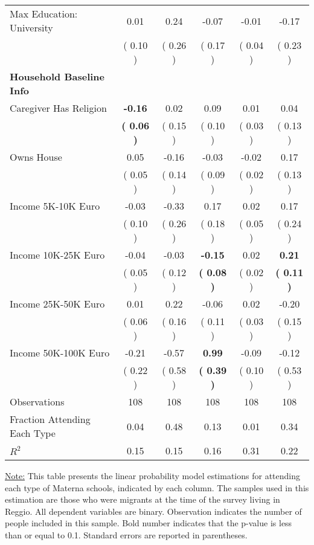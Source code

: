 \begin{table}[H]
{\begin{tabular}{lccccc}
\quad Max Education: University &      0.01 &      0.24 &     -0.07 &     -0.01 &     -0.17 \\
\quad  & (     0.10 ) & (     0.26 )  & (     0.17 )  & (     0.04 ) & (     0.23 ) \\
\midrule
\textbf{Household Baseline Info} \\
\quad Caregiver Has Religion & \textbf{    -0.16} &      0.02 &      0.09 &      0.01 &      0.04 \\
\quad  & \textbf{(     0.06 )} & (     0.15 )  & (     0.10 )  & (     0.03 ) & (     0.13 ) \\
\quad Owns House &      0.05 &     -0.16 &     -0.03 &     -0.02 &      0.17 \\
\quad  & (     0.05 ) & (     0.14 )  & (     0.09 )  & (     0.02 ) & (     0.13 ) \\
\quad Income 5K-10K Euro &     -0.03 &     -0.33 &      0.17 &      0.02 &      0.17 \\
\quad  & (     0.10 ) & (     0.26 )  & (     0.18 )  & (     0.05 ) & (     0.24 ) \\
\quad Income 10K-25K Euro &     -0.04 &     -0.03 & \textbf{    -0.15} &      0.02 & \textbf{     0.21} \\
\quad  & (     0.05 ) & (     0.12 )  & \textbf{(     0.08 )}  & (     0.02 ) & \textbf{(     0.11 )} \\
\quad Income 25K-50K Euro &      0.01 &      0.22 &     -0.06 &      0.02 &     -0.20 \\
\quad  & (     0.06 ) & (     0.16 )  & (     0.11 )  & (     0.03 ) & (     0.15 ) \\
\quad Income 50K-100K Euro &     -0.21 &     -0.57 & \textbf{     0.99} &     -0.09 &     -0.12 \\
\quad  & (     0.22 ) & (     0.58 )  & \textbf{(     0.39 )}  & (     0.10 ) & (     0.53 ) \\
\midrule
Observations & 108 & 108 & 108 & 108 & 108 \\
Fraction Attending Each Type &      0.04 &      0.48 &      0.13 &      0.01 &      0.34 \\
\midrule
$ R^2$ &      0.15 &      0.15 &      0.16 &      0.31 &      0.22 \\
\bottomrule
\end{tabular}}
\end{table}
\begin{scriptsize}
\noindent\underline{Note:} This table presents the linear probability model estimations for attending each type of Materna schools, indicated by each column. The samples used in this estimation are those who were migrants at the time of the survey living in Reggio. All dependent variables are binary. Observation indicates the number of people included in this sample. Bold number indicates that the p-value is less than or equal to 0.1. Standard errors are reported in parentheses.
\end{scriptsize}
